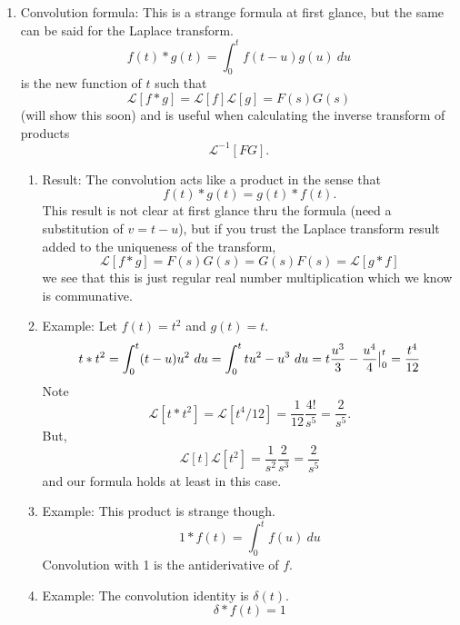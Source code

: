 \documentclass{article}
\begin{document}
\begin{enumerate}
\item Convolution formula: This is a strange formula at first glance, but the same can be said for the Laplace transform.
\[
f(t) \ast g(t) = \int_0^t f(t-u)g(u)~du 
\]
is the new function of $t$ such that 
\[
\mathcal{L}[f\ast g] = \mathcal{L}[f] \mathcal{L}[g] = F(s)G(s)
\]
(will show this soon) and is useful when calculating the inverse transform of products
\[
\mathcal{L}^{-1}[F G].
\]
\begin{enumerate}
\item Result: The convolution acts like a product in the sense that 
\[
f(t) \ast g(t) = g(t) \ast f(t).
\]
This result is not clear at first glance thru the formula (need a substitution of $v=t-u$), but if you trust the Laplace transform result added to the uniqueness of the transform, 
\[
\mathcal{L}[f\ast g] = F(s)G(s) = G(s)F(s) = \mathcal{L}[g\ast f]
\]
we see that this is just regular real number multiplication which we know is communative.
\item Example: Let $f(t)=t^2$ and $g(t)=t$.
\[
t \ast t^2 = \int_0^t (t-u) u^2~du = \int_0^t tu^2 - u^3 ~du = t\frac{u^3}{3} - \frac{u^4}{4}\big{|}_0^t = \frac{t^4}{12} 
\]
Note 
\[
\mathcal{L} [t \ast t^2] = \mathcal{L} [t^4/12] = \frac{1}{12} \frac{4!}{s^5} = \frac{2}{s^5}.
\]
But, 
\[
\mathcal{L}[t] \mathcal{L}[t^2] = \frac{1}{s^2}\frac{2}{s^3} = \frac{2}{s^5}
\]
and our formula holds at least in this case.
\item Example: This product is strange though.
\[
1 \ast f(t) = \int_0^t f(u)~du
\]
Convolution with 1 is the antiderivative of $f$.
\item Example: The convolution identity is $\delta(t)$.
\[
\delta \ast f(t) = 1
\]
\end{enumerate}


\end{enumerate}
\end{document}
